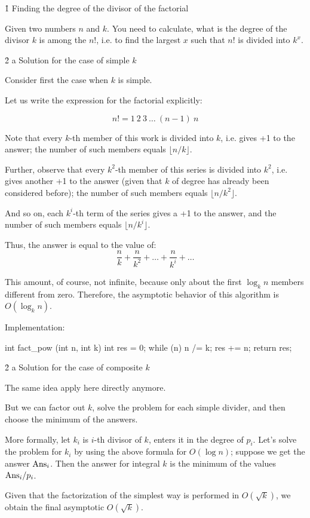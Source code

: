 \h1{ Finding the degree of the divisor of the factorial }

Given two numbers $n$ and $k$. You need to calculate, what is the degree of the divisor $k$ is among the $n!$, i.e. to find the largest $x$ such that $n!$ is divided into $k^x$.


\h2{ a Solution for the case of simple $k$ }

Consider first the case when $k$ is simple.

Let us write the expression for the factorial explicitly:

$$ n! = 1\ 2\ 3\ \ldots\ (n-1)\ n $$

Note that every $k$-th member of this work is divided into $k$, i.e. gives +1 to the answer; the number of such members equals $\lfloor n/k \rfloor$.

Further, observe that every $k^2$-th member of this series is divided into $k^2$, i.e. gives another +1 to the answer (given that $k$ of degree has already been considered before); the number of such members equals $\lfloor n/k^2 \rfloor$.

And so on, each $k^i$-th term of the series gives a +1 to the answer, and the number of such members equals $\lfloor n/k^i \rfloor$.

Thus, the answer is equal to the value of:
$$ \frac{n}{k} + \frac{n}{k^2} + \ldots + \frac{n}{k^i} + \ldots $$

This amount, of course, not infinite, because only about the first $\log_k n$ members different from zero. Therefore, the asymptotic behavior of this algorithm is $O(\log_k n)$.

Implementation:

\code
int fact_pow (int n, int k) {
int res = 0;
while (n) {
n /= k;
res += n;
}
return res;
}
\endcode


\h2{ a Solution for the case of composite $k$ }

The same idea apply here directly anymore.

But we can factor out $k$, solve the problem for each simple divider, and then choose the minimum of the answers.

More formally, let $k_i$ is $i$-th divisor of $k$, enters it in the degree of $p_i$. Let's solve the problem for $k_i$ by using the above formula for $O (\log n)$; suppose we get the answer ${\rm Ans}_i$. Then the answer for integral $k$ is the minimum of the values ${\rm Ans}_i / p_i$.

Given that the factorization of the simplest way is performed in $O (\sqrt{k})$, we obtain the final asymptotic $O (\sqrt{k})$.